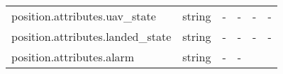 \documentclass[
]{article}
\begin{document}
\begin{longtable}[]{@{}llllll@{}}
\begin{minipage}[t]{0.14\columnwidth}\raggedright
position.attributes.uav\_state\strut
\end{minipage} & \begin{minipage}[t]{0.14\columnwidth}\raggedright
string\strut
\end{minipage} & \begin{minipage}[t]{0.14\columnwidth}\raggedright
-\strut
\end{minipage} & \begin{minipage}[t]{0.14\columnwidth}\raggedright
-\strut
\end{minipage} & \begin{minipage}[t]{0.14\columnwidth}\raggedright
-\strut
\end{minipage} & \begin{minipage}[t]{0.14\columnwidth}\raggedright
-\strut
\end{minipage}\tabularnewline
\begin{minipage}[t]{0.14\columnwidth}\raggedright
position.attributes.landed\_state\strut
\end{minipage} & \begin{minipage}[t]{0.14\columnwidth}\raggedright
string\strut
\end{minipage} & \begin{minipage}[t]{0.14\columnwidth}\raggedright
-\strut
\end{minipage} & \begin{minipage}[t]{0.14\columnwidth}\raggedright
-\strut
\end{minipage} & \begin{minipage}[t]{0.14\columnwidth}\raggedright
-\strut
\end{minipage} & \begin{minipage}[t]{0.14\columnwidth}\raggedright
-\strut
\end{minipage}\tabularnewline
\begin{minipage}[t]{0.14\columnwidth}\raggedright
position.attributes.alarm\strut
\end{minipage} & \begin{minipage}[t]{0.14\columnwidth}\raggedright
string\strut
\end{minipage} & \begin{minipage}[t]{0.14\columnwidth}\raggedright
-\strut
\end{minipage} & \begin{minipage}[t]{0.14\columnwidth}\raggedright
-\strut
\end{minipage} & \begin{minipage}[t]{0.14\columnwidth}\raggedright

\end{minipage}
\end{longtable}
\end{document}
